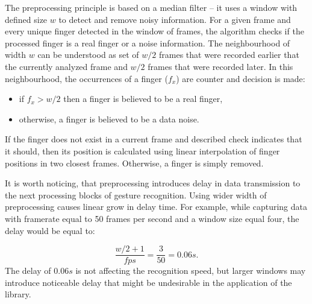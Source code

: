 The preprocessing principle is based on a median filter -- it uses a window with defined size $w$ to detect and remove noisy information. 
For a given frame and every unique finger detected in the window of frames, the algorithm checks if the processed finger is a real finger or a noise information.
The neighbourhood of width $w$ can be understood as set of $w/2$ frames that were recorded earlier that the currently analyzed frame and $w/2$ frames that were recorded later. 
In this neighbourhood, the occurrences of a finger ($f_x$) are counter and decision is made:

\begin{itemize}
\item if $f_x > w/2$ then a finger is believed to be a real finger,
\item otherwise, a finger is believed to be a data noise.
\end{itemize}

If the finger does not exist in a current frame and described check indicates that it should, then its position is calculated using linear interpolation of finger positions in two closest frames. Otherwise, a finger is simply removed.

It is worth noticing, that preprocessing introduces delay in data transmission to the next processing blocks of gesture recognition. 
Using wider width of preprocessing causes linear grow in delay time.
For example, while capturing data with framerate equal to 50 frames per second and a window size equal four, the delay would be equal to:

\begin{equation}
 \frac{w/2+1}{fps} = \frac{3}{50} = 0.06s.
\end{equation}
The delay of $0.06s$ is not affecting the recognition speed, but larger windows may introduce noticeable delay that might be undesirable in the application of the library. 
